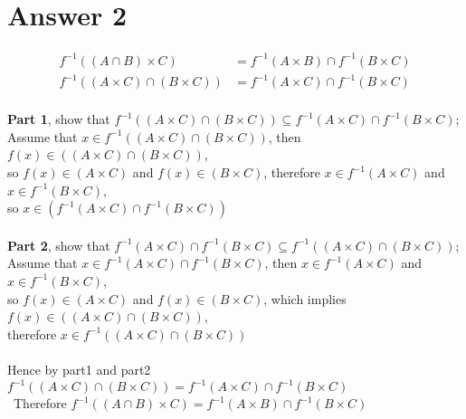 \documentclass[12pt]{article}
\begin{document}
\section*{Answer 2}
\begin{align*}
f^{-1}((A \cap B) \times C) &= f^{-1}(A \times B) \cap f^{-1}(B \times C) \\
f^{-1}((A \times C) \cap (B \times C)) &= f^{-1}(A \times C) \cap f^{-1}(B \times C) \\
\end{align*} 

\hspace*{5mm}\textbf{Part 1}, show that $f^{-1}((A \times C) \cap (B \times C)) \subseteq  f^{-1}(A \times C) \cap f^{-1}(B \times C)$;\\
Assume that $x \in f^{-1}((A \times C) \cap (B \times C))$, then $f(x) \in ((A \times C) \cap (B \times C))$,\\ so $f(x) \in (A \times C)$ and $f(x) \in (B \times C)$, therefore $x \in f^{-1}(A \times C)$ and $x \in  f^{-1}(B \times C)$,\\ so $ x \in ( f^{-1}(A \times C) \cap  f^{-1}(B \times C))$\\\\

\hspace*{5mm}\textbf{Part 2}, show that $ f^{-1}(A \times C) \cap f^{-1}(B \times C) \subseteq f^{-1}((A \times C) \cap (B \times C))$;\\
Assume that $x \in f^{-1}(A \times C) \cap f^{-1}(B \times C)$, then $x \in  f^{-1}(A \times C)$ and $x \in  f^{-1}(B \times C)$,\\ so $f(x) \in (A \times C)$ and $f(x) \in (B \times C)$, which implies $ f(x) \in ((A \times C) \cap (B \times C))$, \\ therefore $x \in  f^{-1}((A \times C) \cap (B \times C))$\\\\

\hspace*{5mm}Hence by part1 and part2 $f^{-1}((A \times C) \cap (B \times C)) =  f^{-1}(A \times C) \cap f^{-1}(B \times C)$\\
\hspace*{5mm}\quad \ Therefore $f^{-1}((A \cap B) \times C) = f^{-1}(A \times B) \cap f^{-1}(B \times C)$
\end{document}
